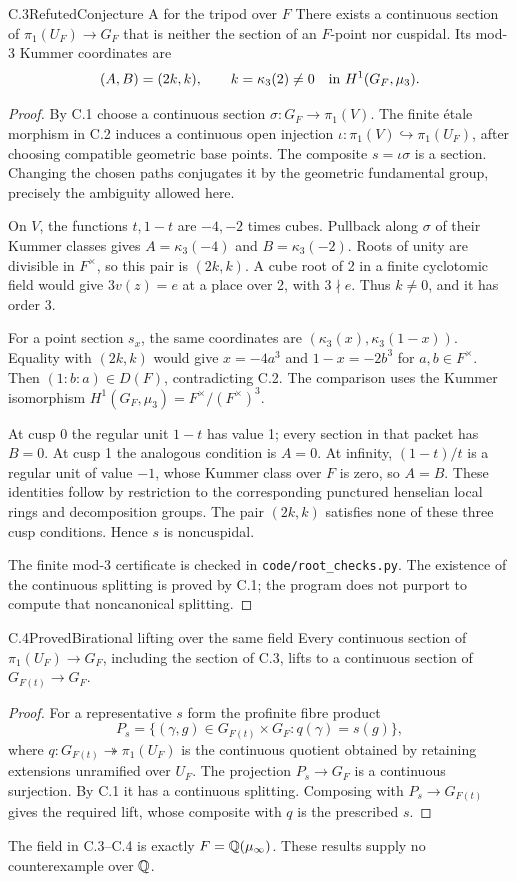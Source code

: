 \begin{statement}{C.3}{Refuted}{Conjecture A for the tripod over $F$}
There exists a continuous section of $\pi_1(U_F)\to G_F$ that is
neither the section of an $F$-point nor cuspidal. Its mod-3
Kummer coordinates are
\[
 (A,B)=(2k,k),\qquad
 k=\kappa_3(2)\ne0\quad\hbox{in }H^1(G_F,\mu_3).
\]
\end{statement}
\begin{proof}
By C.1 choose a continuous section
$\sigma:G_F\to\pi_1(V)$. The finite \'etale morphism in C.2 induces
a continuous open injection
$\iota:\pi_1(V)\hookrightarrow\pi_1(U_F)$, after choosing compatible
geometric base points. The composite $s=\iota\sigma$ is a section.
Changing the chosen paths conjugates it by the geometric fundamental
group, precisely the ambiguity allowed here.

On $V$, the functions $t,1-t$ are $-4,-2$ times cubes.
Pullback along $\sigma$ of their Kummer classes gives
$A=\kappa_3(-4)$ and $B=\kappa_3(-2)$. Roots of unity are divisible
in $F^\times$, so this pair is $(2k,k)$. A cube root of 2 in a finite
cyclotomic field would give $3v(z)=e$ at a place over 2, with
$3\nmid e$. Thus $k\ne0$, and it has order 3.

For a point section $s_x$, the same coordinates are
$(\kappa_3(x),\kappa_3(1-x))$. Equality with $(2k,k)$ would give
$x=-4a^3$ and $1-x=-2b^3$ for $a,b\in F^\times$. Then
$(1:b:a)\in D(F)$, contradicting C.2. The comparison uses the
Kummer isomorphism
$H^1(G_F,\mu_3)=F^\times/(F^\times)^3$.

At cusp 0 the regular unit $1-t$ has value 1; every section in
that packet has $B=0$. At cusp 1 the analogous condition is $A=0$.
At infinity, $(1-t)/t$ is a regular unit of value $-1$, whose
Kummer class over $F$ is zero, so $A=B$. These identities follow
by restriction to the corresponding punctured henselian local
rings and decomposition groups. The pair $(2k,k)$ satisfies none
of these three cusp conditions. Hence $s$ is noncuspidal.

The finite mod-3 certificate is checked in
\texttt{code/root\_checks.py}. The existence of the continuous
splitting is proved by C.1; the program does not purport to
compute that noncanonical splitting.
\end{proof}

\begin{statement}{C.4}{Proved}{Birational lifting over the same field}
Every continuous section of $\pi_1(U_F)\to G_F$, including the
section of C.3, lifts to a continuous section of
$G_{F(t)}\to G_F$.
\end{statement}
\begin{proof}
For a representative $s$ form the profinite fibre product
\[
 P_s=\{(\gamma,g)\in G_{F(t)}\times G_F:q(\gamma)=s(g)\},
\]
where $q:G_{F(t)}\twoheadrightarrow\pi_1(U_F)$ is the continuous
quotient obtained by retaining extensions unramified over $U_F$.
The projection $P_s\to G_F$ is a continuous surjection.
By C.1 it has a continuous splitting. Composing with
$P_s\to G_{F(t)}$ gives the required lift, whose composite with
$q$ is the prescribed $s$.
\end{proof}
The field in C.3--C.4 is exactly $F=\mathbb Q(\mu_\infty)$.
These results supply no counterexample over $\mathbb Q$.
